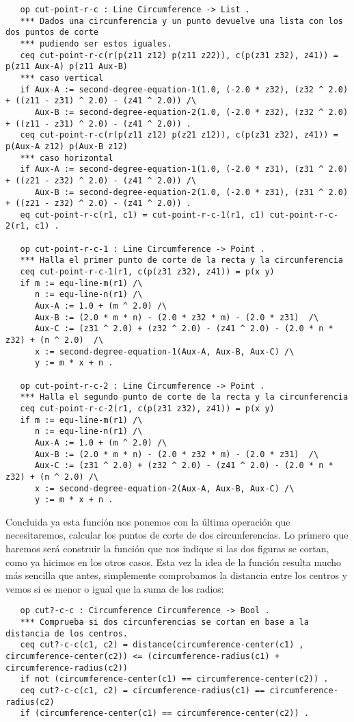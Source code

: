 {{\codesize
\begin{verbatim}
   op cut-point-r-c : Line Circumference -> List .
   *** Dados una circunferencia y un punto devuelve una lista con los dos puntos de corte
   *** pudiendo ser estos iguales.
   ceq cut-point-r-c(r(p(z11 z12) p(z11 z22)), c(p(z31 z32), z41)) = p(z11 Aux-A) p(z11 Aux-B)
   *** caso vertical 
   if Aux-A := second-degree-equation-1(1.0, (-2.0 * z32), (z32 ^ 2.0) + ((z11 - z31) ^ 2.0) - (z41 ^ 2.0)) /\
      Aux-B := second-degree-equation-2(1.0, (-2.0 * z32), (z32 ^ 2.0) + ((z11 - z31) ^ 2.0) - (z41 ^ 2.0)) .
   ceq cut-point-r-c(r(p(z11 z12) p(z21 z12)), c(p(z31 z32), z41)) = p(Aux-A z12) p(Aux-B z12)
   *** caso horizontal
   if Aux-A := second-degree-equation-1(1.0, (-2.0 * z31), (z31 ^ 2.0) + ((z21 - z32) ^ 2.0) - (z41 ^ 2.0)) /\
      Aux-B := second-degree-equation-2(1.0, (-2.0 * z31), (z31 ^ 2.0) + ((z21 - z32) ^ 2.0) - (z41 ^ 2.0)) .
   eq cut-point-r-c(r1, c1) = cut-point-r-c-1(r1, c1) cut-point-r-c-2(r1, c1) .

   op cut-point-r-c-1 : Line Circumference -> Point .
   *** Halla el primer punto de corte de la recta y la circunferencia
   ceq cut-point-r-c-1(r1, c(p(z31 z32), z41)) = p(x y)
   if m := equ-line-m(r1) /\
      n := equ-line-n(r1) /\
      Aux-A := 1.0 + (m ^ 2.0) /\
      Aux-B := (2.0 * m * n) - (2.0 * z32 * m) - (2.0 * z31)  /\
      Aux-C := (z31 ^ 2.0) + (z32 ^ 2.0) - (z41 ^ 2.0) - (2.0 * n * z32) + (n ^ 2.0)  /\
      x := second-degree-equation-1(Aux-A, Aux-B, Aux-C) /\
      y := m * x + n .

   op cut-point-r-c-2 : Line Circumference -> Point .
   *** Halla el segundo punto de corte de la recta y la circunferencia
   ceq cut-point-r-c-2(r1, c(p(z31 z32), z41)) = p(x y)
   if m := equ-line-m(r1) /\
      n := equ-line-n(r1) /\
      Aux-A := 1.0 + (m ^ 2.0) /\
      Aux-B := (2.0 * m * n) - (2.0 * z32 * m) - (2.0 * z31)  /\
      Aux-C := (z31 ^ 2.0) + (z32 ^ 2.0) - (z41 ^ 2.0) - (2.0 * n * z32) + (n ^ 2.0) /\
      x := second-degree-equation-2(Aux-A, Aux-B, Aux-C) /\
      y := m * x + n .

\end{verbatim}
}

Concluida ya esta función nos ponemos con la última operación que necesitaremos, calcular los puntos de corte de dos circunferencias. Lo primero que haremos será construir la función que nos indique si las dos figuras se cortan, como ya hicimos en los otros casos. Esta vez la idea de la función resulta mucho más sencilla que antes, simplemente comprobamos la distancia entre los centros y vemos si es menor o igual que la suma de los radios: \par
{\codesize
\begin{verbatim}
   op cut?-c-c : Circumference Circumference -> Bool .
   *** Comprueba si dos circunferencias se cortan en base a la distancia de los centros.
   ceq cut?-c-c(c1, c2) = distance(circumference-center(c1) , circumference-center(c2)) <= (circumference-radius(c1) + circumference-radius(c2))
   if not (circumference-center(c1) == circumference-center(c2)) . 
   ceq cut?-c-c(c1, c2) = circumference-radius(c1) == circumference-radius(c2)
   if (circumference-center(c1) == circumference-center(c2)) .
\end{verbatim}
}

}
